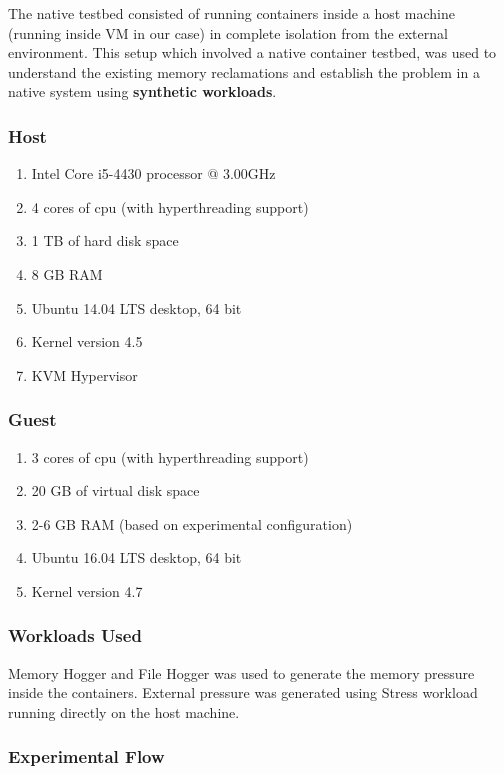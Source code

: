        The native testbed consisted of running containers inside a host machine (running inside VM in our case) in complete isolation from 
the external environment. This setup which involved a native container testbed, was used to understand the existing memory reclamations and 
establish the problem in a native system using \textbf{synthetic workloads}.
	
      \subsubsection{Host}
	
	\begin{enumerate}
	  \item Intel Core i5-4430 processor @ 3.00GHz
	  \item 4 cores of cpu (with hyperthreading support)
	  \item 1 TB of hard disk space
	  \item 8 GB RAM
	  \item Ubuntu 14.04 LTS desktop, 64 bit 
	  \item Kernel version 4.5
	  \item KVM Hypervisor
	\end{enumerate}
      
      \subsubsection{Guest}
	
	\begin{enumerate}
	  \item 3 cores of cpu (with hyperthreading support)
	  \item 20 GB of virtual disk space
	  \item 2-6 GB RAM (based on experimental configuration)
	  \item Ubuntu 16.04 LTS desktop, 64 bit
	  \item Kernel version 4.7
	\end{enumerate}
	
      \subsubsection{Workloads Used}
	
	Memory Hogger and File Hogger was used to generate the memory pressure inside the containers. External pressure was generated 
using Stress workload running directly on the host machine.

      \subsubsection{Experimental Flow}
	
